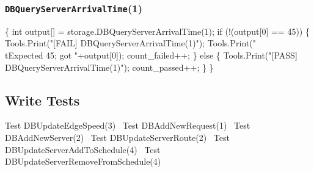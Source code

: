 \documentclass{article}
\def\nwendcode{\endtrivlist \endgroup}
\let\nwdocspar=\par
\begin{document}
\subsubsection{{\tt{}DBQueryServerArrivalTime}(1)}
\nwenddocs{}\endmoddef{}
\{
  int output[] = storage.DBQueryServerArrivalTime(1);
  if (!(output[0] == 45)) \{
    Tools.Print("[FAIL] DBQueryServerArrivalTime(1)");
    Tools.Print("\\tExpected 45; got "+output[0]);
    count_failed++;
  \} else \{
    Tools.Print("[PASS] DBQueryServerArrivalTime(1)");
    count_passed++;
  \}
\}
\nwendcode{}\nwdocspar

\subsection{Write Tests}
\label{sec:write-tests}
\nwenddocs{}\endmoddef{}
\LA{}Test \code{}DBUpdateEdgeSpeed\edoc{}(3)~{\nwtagstyle{}}\RA{}
\LA{}Test \code{}DBAddNewRequest\edoc{}(1)~{\nwtagstyle{}}\RA{}
\LA{}Test \code{}DBAddNewServer\edoc{}(2)~{\nwtagstyle{}}\RA{}
\LA{}Test \code{}DBUpdateServerRoute\edoc{}(2)~{\nwtagstyle{}}\RA{}
\LA{}Test \code{}DBUpdateServerAddToSchedule\edoc{}(4)~{\nwtagstyle{}}\RA{}
\LA{}Test \code{}DBUpdateServerRemoveFromSchedule\edoc{}(4)~{\nwtagstyle{}}\RA{}
\nwendcode{}\nwdocspar
\end{document}
